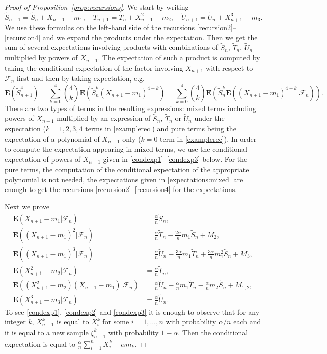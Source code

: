 \documentclass[12pt,a4paper]{article}
\newcommand{\E}{\mathbf E}
\newcommand{\wt}{\widetilde}
\newcommand{\F}{\mathcal F}
\numberwithin{equation}{section}
\begin{document}
\begin{proof}[Proof of Proposition~\ref{prop:recursions}]
We start by writing
\begin{equation}\label{recursionrewrite}
\wt S_{n+1}=\wt S_n+X_{n+1}-m_1,\quad\wt T_{n+1}=\wt T_n+X_{n+1}^2-m_2,\quad\wt U_{n+1}=\wt U_n+X_{n+1}^3-m_3.
\end{equation}
We use these formulas on the left-hand side of the recursions \eqref{recursion2}--\eqref{recursion4} and we expand the products under the expectation.
Then we get the sum of several expectations involving products with combinations of $\wt S_n$, $\wt T_n$, $\wt U_n$ multiplied by powers of $X_{n+1}$.
The expectation of such a product is computed by taking the conditional expectation of the factor involving $X_{n+1}$ with respect to $\F_n$ first
and then by taking expectation, e.g.
\begin{equation}\label{examplerec}
\E(\wt S_{n+1}^4)=\sum_{k=0}^4\binom4k\E(\wt S_n^k(X_{n+1}-m_1)^{4-k})=\sum_{k=0}^4\binom4k\E(\wt S_n^k\E((X_{n+1}-m_1)^{4-k}|\F_n)).
\end{equation}
There are two types of terms in the resulting expressions:
mixed terms including powers of $X_{n+1}$ multiplied by an expression of $\wt S_n$, $\wt T_n$ or $\wt U_n$ under the expectation
($k=1,2,3,4$ terms in \eqref{examplerec})
and pure terms being the expectation of a polynomial of $X_{n+1}$ only ($k=0$ term in \eqref{examplerec}).
In order to compute the expectation appearing in mixed terms, we use the conditional expectation of powers of $X_{n+1}$ given in \eqref{condexp1}--\eqref{condexp3} below.
For the pure terms, the computation of the conditional expectation of the appropriate polynomial is not needed,
the expectations given in \eqref{expectations:mixed} are enough to get the recursions \eqref{recursion2}--\eqref{recursion4} for the expectations.

Next we prove
\begin{align}
\E(X_{n+1}-m_1|\F_n)&=\frac\alpha n\wt S_n,\label{condexp1}\\
\E((X_{n+1}-m_1)^2|\F_n)&=\frac\alpha n\wt T_n-\frac{2\alpha}nm_1\wt S_n+M_2,\label{condexp11}\\
\E((X_{n+1}-m_1)^3|\F_n)&=\frac\alpha n\wt U_n-\frac{3\alpha}nm_1\wt T_n+\frac{3\alpha}nm_1^2\wt S_n+M_3,\label{condexp111}\\
\E(X_{n+1}^2-m_2|\F_n)&=\frac\alpha n\wt T_n,\label{condexp2}\\
\E((X_{n+1}^2-m_2)(X_{n+1}-m_1)|\F_n)&=\frac\alpha n\wt U_n-\frac\alpha nm_1\wt T_n-\frac\alpha nm_2\wt S_n+M_{1,2},\label{condexp12}\\
\E(X_{n+1}^3-m_3|\F_n)&=\frac\alpha n\wt U_n.\label{condexp3}
\end{align}
To see \eqref{condexp1}, \eqref{condexp2} and \eqref{condexp3} it is enough to observe that for any integer $k$,
$X_{n+1}^k$ is equal to $X_i^k$ for some $i=1,\dots,n$ with probability $\alpha/n$ each
and it is equal to a new sample $\xi_{n+1}^k$ with probability $1-\alpha$.
Then the conditional expectation is equal to $\frac\alpha n\sum_{i=1}^nX_i^k-\alpha m_k$.


\end{proof}
\end{document}
